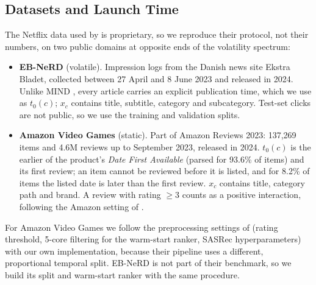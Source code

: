 \documentclass[11pt]{article}
\begin{document}
\subsection{Datasets and Launch Time}
The Netflix data used by \citet{li2026llmreasoning} is proprietary, so we reproduce their protocol, not their numbers, on two public domains at opposite ends of the volatility spectrum:
\begin{itemize}
  \item \textbf{EB-NeRD} \citep{kruse2024ebnerd} (volatile). Impression logs from the Danish news site Ekstra Bladet, collected between 27 April and 8 June 2023 and released in 2024. Unlike MIND \citep{wu2020mind}, every article carries an explicit publication time, which we use as $t_0(c)$; $x_c$ contains title, subtitle, category and subcategory. Test-set clicks are not public, so we use the training and validation splits.
  \item \textbf{Amazon Video Games} \citep{hou2024bridging} (static). Part of Amazon Reviews 2023: 137,269 items and 4.6M reviews up to September 2023, released in 2024. $t_0(c)$ is the earlier of the product's \emph{Date First Available} (parsed for 93.6\% of items) and its first review; an item cannot be reviewed before it is listed, and for 8.2\% of items the listed date is later than the first review. $x_c$ contains title, category path and brand. A review with rating $\geq 3$ counts as a positive interaction, following the Amazon setting of \citet{dong2026diagnosing}.
\end{itemize}
For Amazon Video Games we follow the preprocessing settings of \citet{dong2026diagnosing} (rating threshold, 5-core filtering for the warm-start ranker, SASRec hyperparameters) with our own implementation, because their pipeline uses a different, proportional temporal split. EB-NeRD is not part of their benchmark, so we build its split and warm-start ranker with the same procedure.
\end{document}

